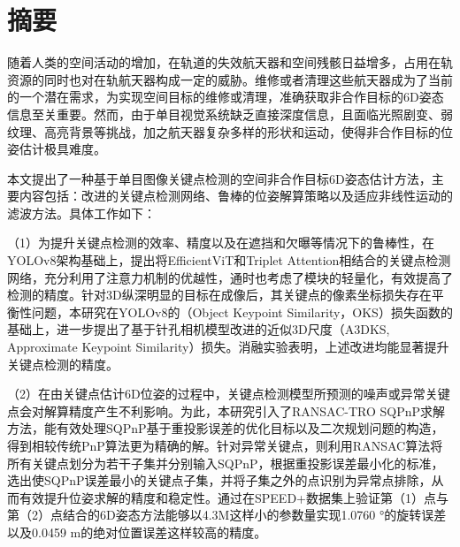 \maketitle%
\MAKETITLE%
\makedeclaration%

\intotoc\chapter*{摘\qquad 要}%
\setcounter{page}{1}%

随着人类的空间活动的增加，在轨道的失效航天器和空间残骸日益增多，占用在轨资源的同时也对在轨航天器构成一定的威胁。维修或者清理这些航天器成为了当前的一个潜在需求，为实现空间目标的维修或清理，准确获取非合作目标的6D姿态信息至关重要。然而，由于单目视觉系统缺乏直接深度信息，且面临光照剧变、弱纹理、高亮背景等挑战，加之航天器复杂多样的形状和运动，使得非合作目标的位姿估计极具难度。

本文提出了一种基于单目图像关键点检测的空间非合作目标6D姿态估计方法，主要内容包括：改进的关键点检测网络、鲁棒的位姿解算策略以及适应非线性运动的滤波方法。具体工作如下：

	
（1）为提升关键点检测的效率、精度以及在遮挡和欠曝等情况下的鲁棒性，在YOLOv8架构基础上，提出将EfficientViT和Triplet Attention相结合的关键点检测网络，充分利用了注意力机制的优越性，通时也考虑了模块的轻量化，有效提高了检测的精度。针对3D纵深明显的目标在成像后，其关键点的像素坐标损失存在平衡性问题，本研究在YOLOv8的（Object Keypoint Similarity，OKS）损失函数的基础上，进一步提出了基于针孔相机模型改进的近似3D尺度（A3DKS, Approximate Keypoint Similarity）损失。消融实验表明，上述改进均能显著提升关键点检测的精度。

（2）在由关键点估计6D位姿的过程中，关键点检测模型所预测的噪声或异常关键点会对解算精度产生不利影响。为此，本研究引入了RANSAC-TRO SQPnP求解方法，能有效处理SQPnP基于重投影误差的优化目标以及二次规划问题的构造，得到相较传统PnP算法更为精确的解。针对异常关键点，则利用RANSAC算法将所有关键点划分为若干子集并分别输入SQPnP，根据重投影误差最小化的标准，选出使SQPnP误差最小的关键点子集，并将子集之外的点识别为异常点排除，从而有效提升位姿求解的精度和稳定性。通过在SPEED+数据集上验证第（1）点与第（2）点结合的6D姿态方法能够以4.3M这样小的参数量实现1.0760 °的旋转误差以及0.0459 m的绝对位置误差这样较高的精度。

